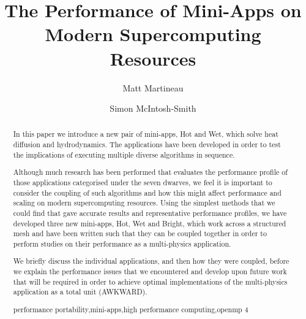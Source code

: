 \documentclass[runningheads,a4paper]{llncs}
\newcommand{\keywords}[1]{\par\addvspace\baselineskip
\noindent\keywordname\enspace\ignorespaces#1}
\begin{document}
\mainmatter  %

\title{The Performance of Mini-Apps on Modern Supercomputing Resources}


\author{Matt Martineau \and Simon McIntosh-Smith}
%


%
%

\maketitle


\begin{abstract}
  In this paper we introduce a new pair of mini-apps, Hot and Wet, which solve heat diffusion and hydrodynamics. The applications have been developed in order to test the implications of executing multiple diverse algorithms in sequence. 

  Although much research has been performed that evaluates the performance profile of those applications categorised under the seven dwarves, we feel it is important to consider the coupling of such algorithms and how this might affect performance and scaling on modern supercomputing resources. Using the simplest methods that we could find that gave accurate results and representative performance profiles, we have developed three new mini-apps, Hot, Wet and Bright, which work across a structured mesh and have been written such that they can be coupled together in order to perform studies on their performance as a multi-physics application.

  We briefly discuss the individual applications, and then how they were coupled, before we explain the performance issues that we encountered and develop upon future work that will be required in order to achieve optimal implementations of the multi-physics application as a total unit (AWKWARD).
\keywords{performance portability,mini-apps,high performance computing,openmp 4}
\end{abstract}
\end{document}
